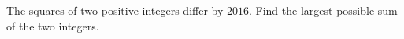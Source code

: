 The squares of two positive integers differ by $2016$. Find the largest possible sum of the two integers.
